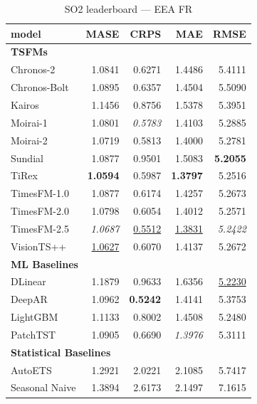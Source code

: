 \begin{table}[H]
\caption{SO2 leaderboard --- EEA FR}
\centering
\begin{small}
\begin{tabular}{lrrrr}
\toprule
model & MASE & CRPS & MAE & RMSE \\
\midrule
\multicolumn{5}{l}{\textbf{TSFMs}} \\
Chronos-2 & 1.0841 & 0.6271 & 1.4486 & 5.4111 \\
Chronos-Bolt & 1.0895 & 0.6357 & 1.4504 & 5.5090 \\
Kairos & 1.1456 & 0.8756 & 1.5378 & 5.3951 \\
Moirai-1 & 1.0801 & \textit{0.5783} & 1.4103 & 5.2885 \\
Moirai-2 & 1.0719 & 0.5813 & 1.4000 & 5.2781 \\
Sundial & 1.0877 & 0.9501 & 1.5083 & \textbf{5.2055} \\
TiRex & \textbf{1.0594} & 0.5987 & \textbf{1.3797} & 5.2516 \\
TimesFM-1.0 & 1.0877 & 0.6174 & 1.4257 & 5.2673 \\
TimesFM-2.0 & 1.0798 & 0.6054 & 1.4012 & 5.2571 \\
TimesFM-2.5 & \textit{1.0687} & \underline{0.5512} & \underline{1.3831} & \textit{5.2422} \\
VisionTS++ & \underline{1.0627} & 0.6070 & 1.4137 & 5.2672 \\
\midrule
\multicolumn{5}{l}{\textbf{ML Baselines}} \\
DLinear & 1.1879 & 0.9633 & 1.6356 & \underline{5.2230} \\
DeepAR & 1.0962 & \textbf{0.5242} & 1.4141 & 5.3753 \\
LightGBM & 1.1133 & 0.8002 & 1.4508 & 5.2480 \\
PatchTST & 1.0905 & 0.6690 & \textit{1.3976} & 5.3111 \\
\midrule
\multicolumn{5}{l}{\textbf{Statistical Baselines}} \\
AutoETS & 1.2921 & 2.0221 & 2.1085 & 5.7417 \\
Seasonal Naive & 1.3894 & 2.6173 & 2.1497 & 7.1615 \\
\bottomrule
\end{tabular}
\end{small}
\end{table}